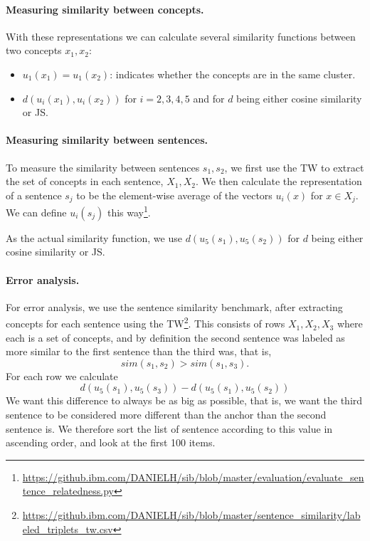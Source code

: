 \documentclass{article}
\begin{document}
\paragraph{Measuring similarity between concepts.}

With these representations we can calculate several similarity functions
between two concepts $x_1,x_2$:
\begin{itemize}
\item $u_1(x_1)=u_1(x_2)$:
  indicates whether the concepts are in the same cluster.
\item $d(u_i(x_1),u_i(x_2))$ for $i=2,3,4,5$ and for $d$ being either
  cosine similarity or JS.
\end{itemize}


\paragraph{Measuring similarity between sentences.}

To measure the similarity between sentences $s_1,s_2$, we first use the TW
to extract the set of concepts in each sentence, $X_1,X_2$.
We then calculate the representation of a sentence $s_j$ to be the element-wise average
of the vectors $u_i(x)$ for $x\in X_j$.
We can define $u_i(s_j)$ this
way\footnote{\url{https://github.ibm.com/DANIELH/sib/blob/master/evaluation/evaluate_sentence_relatedness.py}}.

As the actual similarity function, we use $d(u_5(s_1),u_5(s_2))$ for $d$ being either
  cosine similarity or JS.
  
\paragraph{Error analysis.}
For error analysis, we use the sentence similarity benchmark,
after extracting concepts for each sentence using the
TW\footnote{\url{https://github.ibm.com/DANIELH/sib/blob/master/sentence_similarity/labeled_triplets_tw.csv}}.
This consists of rows $X_1,X_2,X_3$ where each is a set of concepts,
and by definition the second sentence was labeled as more similar to the first
sentence than the third was, that is,
\[
sim(s_1,s_2)>sim(s_1,s_3).
\]
For each row we calculate
\[
d(u_5(s_1),u_5(s_3)) - d(u_5(s_1),u_5(s_2))
\]
We want this difference to always be as big as possible,
that is, we want the third sentence to be considered more different than
the anchor than the second sentence is.
We therefore sort the list of sentence according to this value
in ascending order, and look at the first 100 items.
\end{document}

